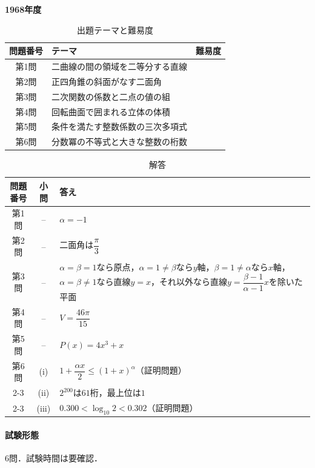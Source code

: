 \documentclass[../../main.tex]{subfiles}
\begin{document}
\begin{center}
  {\fontsize{48pt}{58pt}\selectfont \textbf{1968}\normalsize\textbf{年度}}
\end{center}

\begin{table}[htb]
  \centering
  \caption{出題テーマと難易度}
  \begin{tabular}{|c|p{9cm}|c|}
    \hline
    \textbf{問題番号} & \textbf{テーマ} & \textbf{難易度} \\
    \hline
    第1問 & 二曲線の間の領域を二等分する直線 & \\
    \hline
    第2問 & 正四角錐の斜面がなす二面角 & \\
    \hline
    第3問 & 二次関数の係数と二点の値の組 & \\
    \hline
    第4問 & 回転曲面で囲まれる立体の体積 & \\
    \hline
    第5問 & 条件を満たす整数係数の三次多項式 & \\
    \hline
    第6問 & 分数冪の不等式と大きな整数の桁数 & \\
    \hline
  \end{tabular}
\end{table}

\begin{table}[htb]
  \centering
  \caption{解答}
  \renewcommand{\arraystretch}{1.4}
  \begin{tabular}{|c|c|p{9cm}|}
    \hline
    \textbf{問題番号} & \textbf{小問} & \textbf{答え} \\
    \hline
    第1問 & -- & $\alpha=-1$ \\
    \hline
    第2問 & -- & 二面角は$\dfrac{\pi}{3}$ \\
    \hline
    第3問 & -- & $\alpha=\beta=1$なら原点，$\alpha=1\ne\beta$なら$y$軸，$\beta=1\ne\alpha$なら$x$軸，$\alpha=\beta\ne1$なら直線$y=x$，それ以外なら直線$y=\dfrac{\beta-1}{\alpha-1}x$を除いた平面 \\
    \hline
    第4問 & -- & $V=\dfrac{46\pi}{15}$ \\
    \hline
    第5問 & -- & $P(x)=4x^3+x$ \\
    \hline
    第6問 & (i) & $1+\dfrac{\alpha x}{2}\le(1+x)^\alpha$（証明問題） \\
    \cline{2-3}
    & (ii) & $2^{200}$は$61$桁，最上位は$1$ \\
    \cline{2-3}
    & (iii) & $0.300<\log_{10}2<0.302$（証明問題） \\
    \hline
  \end{tabular}
\end{table}

\paragraph{試験形態}
6問．試験時間は要確認．
\end{document}
